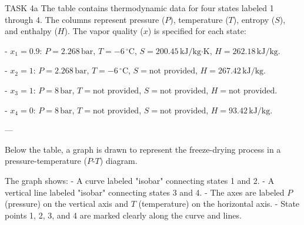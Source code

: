 TASK 4a  
The table contains thermodynamic data for four states labeled 1 through 4. The columns represent pressure (\(P\)), temperature (\(T\)), entropy (\(S\)), and enthalpy (\(H\)). The vapor quality (\(x\)) is specified for each state:  

- \(x_1 = 0.9\):  
  \(P = 2.268 \, \text{bar}\), \(T = -6 \, ^\circ\text{C}\), \(S = 200.45 \, \text{kJ/kg·K}\), \(H = 262.18 \, \text{kJ/kg}\).  

- \(x_2 = 1\):  
  \(P = 2.268 \, \text{bar}\), \(T = -6 \, ^\circ\text{C}\), \(S = \text{not provided}\), \(H = 267.42 \, \text{kJ/kg}\).  

- \(x_3 = 1\):  
  \(P = 8 \, \text{bar}\), \(T = \text{not provided}\), \(S = \text{not provided}\), \(H = \text{not provided}\).  

- \(x_4 = 0\):  
  \(P = 8 \, \text{bar}\), \(T = \text{not provided}\), \(S = \text{not provided}\), \(H = 93.42 \, \text{kJ/kg}\).  

---

Below the table, a graph is drawn to represent the freeze-drying process in a pressure-temperature (\(P\)-\(T\)) diagram.  

The graph shows:  
- A curve labeled "isobar" connecting states 1 and 2.  
- A vertical line labeled "isobar" connecting states 3 and 4.  
- The axes are labeled \(P\) (pressure) on the vertical axis and \(T\) (temperature) on the horizontal axis.  
- State points 1, 2, 3, and 4 are marked clearly along the curve and lines.  
